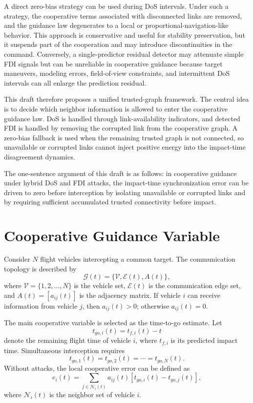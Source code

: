 \documentclass[lettersize,journal]{IEEEtran}
\begin{document}
A direct zero-bias strategy can be used during DoS intervals. Under such a strategy, the cooperative terms associated with disconnected links are removed, and the guidance law degenerates to a local or proportional-navigation-like behavior. This approach is conservative and useful for stability preservation, but it suspends part of the cooperation and may introduce discontinuities in the command. Conversely, a single-predictor residual detector may attenuate simple FDI signals but can be unreliable in cooperative guidance because target maneuvers, modeling errors, field-of-view constraints, and intermittent DoS intervals can all enlarge the prediction residual.

This draft therefore proposes a unified trusted-graph framework. The central idea is to decide which neighbor information is allowed to enter the cooperative guidance law. DoS is handled through link-availability indicators, and detected FDI is handled by removing the corrupted link from the cooperative graph. A zero-bias fallback is used when the remaining trusted graph is not connected, so unavailable or corrupted links cannot inject positive energy into the impact-time disagreement dynamics.

The one-sentence argument of this draft is as follows: in cooperative guidance under hybrid DoS and FDI attacks, the impact-time synchronization error can be driven to zero before interception by isolating unavailable or corrupted links and by requiring sufficient accumulated trusted connectivity before impact.

\section{Cooperative Guidance Variable}

Consider $N$ flight vehicles intercepting a common target. The communication topology is described by
\begin{equation}
    \mathcal{G}(t)=\{\mathcal{V},\mathcal{E}(t),A(t)\},
\end{equation}
where $\mathcal{V}=\{1,2,\ldots,N\}$ is the vehicle set, $\mathcal{E}(t)$ is the communication edge set, and $A(t)=[a_{ij}(t)]$ is the adjacency matrix. If vehicle $i$ can receive information from vehicle $j$, then $a_{ij}(t)>0$; otherwise $a_{ij}(t)=0$.

The main cooperative variable is selected as the time-to-go estimate. Let
\begin{equation}
    t_{go,i}(t)=t_{f,i}(t)-t
\end{equation}
denote the remaining flight time of vehicle $i$, where $t_{f,i}$ is its predicted impact time. Simultaneous interception requires
\begin{equation}
    t_{go,1}(t)=t_{go,2}(t)=\cdots=t_{go,N}(t).
\end{equation}
Without attacks, the local cooperative error can be defined as
\begin{equation}
    e_i(t)=
    \sum_{j\in\mathcal{N}_i(t)}
    a_{ij}(t)\left[t_{go,i}(t)-t_{go,j}(t)\right],
    \label{eq:nominal_error}
\end{equation}
where $\mathcal{N}_i(t)$ is the neighbor set of vehicle $i$.
\end{document}
